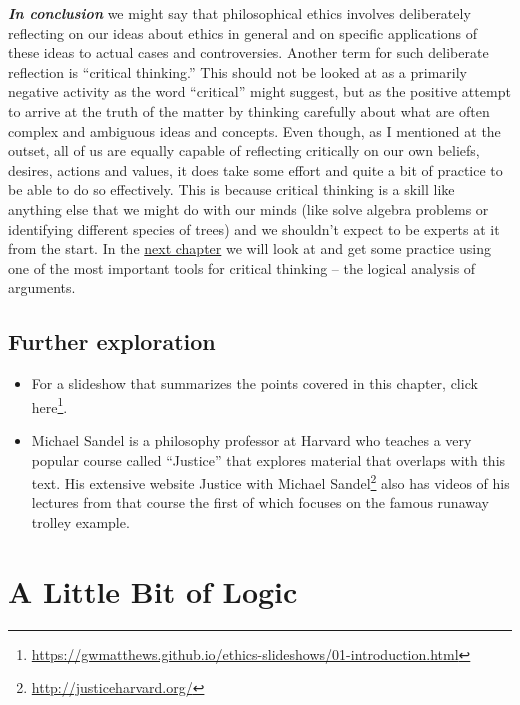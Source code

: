 \documentclass[12pt, openany]{book}
\renewcommand{\href}[2]{#2\footnote{\url{#1}}}
\begin{document}
\textbf{\emph{In conclusion}} we might say that philosophical ethics involves deliberately reflecting on our ideas about ethics in general and on specific applications of these ideas to actual cases and controversies. Another term for such deliberate reflection is ``critical thinking.'' This should not be looked at as a primarily negative activity as the word ``critical'' might suggest, but as the positive attempt to arrive at the truth of the matter by thinking carefully about what are often complex and ambiguous ideas and concepts. Even though, as I mentioned at the outset, all of us are equally capable of reflecting critically on our own beliefs, desires, actions and values, it does take some effort and quite a bit of practice to be able to do so effectively. This is because critical thinking is a skill like anything else that we might do with our minds (like solve algebra problems or identifying different species of trees) and we shouldn't expect to be experts at it from the start. In the \protect\hyperlink{logic}{next chapter} we will look at and get some practice using one of the most important tools for critical thinking -- the logical analysis of arguments.

\hypertarget{further-exploration}{%
\section*{Further exploration}\label{further-exploration}}


\begin{itemize}
\item
  For a slideshow that summarizes the points covered in this chapter, \href{https://gwmatthews.github.io/ethics-slideshows/01-introduction.html}{click here}.
\item
  Michael Sandel is a philosophy professor at Harvard who teaches a very popular course called ``Justice'' that explores material that overlaps with this text. His extensive website \href{http://justiceharvard.org/}{Justice with Michael Sandel} also has videos of his lectures from that course the first of which focuses on the famous runaway trolley example.
\end{itemize}

\hypertarget{logic}{%
\chapter{A Little Bit of Logic}\label{logic}}
\end{document}
